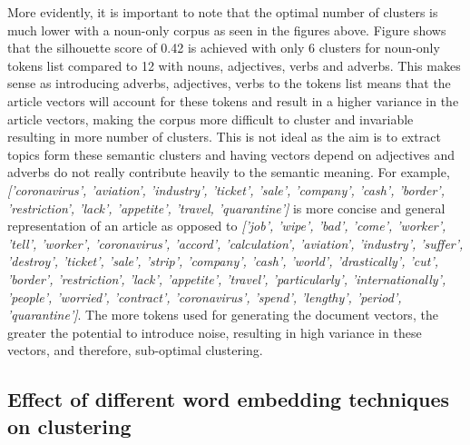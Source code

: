 More evidently, it is important to note that the optimal number of clusters is much lower with a noun-only corpus as seen in the figures above. Figure \label{fig:pos_business2020} shows that the silhouette score of 0.42 is achieved with only 6 clusters for noun-only tokens list compared to 12 with nouns, adjectives, verbs and adverbs. This makes sense as introducing adverbs, adjectives, verbs to the tokens list means that the article vectors will account for these tokens and result in a higher variance in the article vectors, making the corpus more difficult to cluster and invariable resulting in more number of clusters. This is not ideal as the aim is to extract topics form these semantic clusters and having vectors depend on adjectives and adverbs do not really contribute heavily to the semantic meaning. For example, \textit{['coronavirus', 'aviation', 'industry', 'ticket', 'sale', 'company', 'cash', 'border', 'restriction', 'lack', 'appetite', 'travel, 'quarantine']} is more concise and general representation of an article as opposed to \textit{['job', 'wipe', 'bad', 'come', 'worker', 'tell', 'worker', 'coronavirus', 'accord', 'calculation', 'aviation', 'industry', 'suffer', 'destroy', 'ticket', 'sale', 'strip', 'company', 'cash', 'world', 'drastically', 'cut', 'border', 'restriction', 'lack', 'appetite', 'travel', 'particularly', 'internationally', 'people', 'worried', 'contract', 'coronavirus', 'spend', 'lengthy', 'period', 'quarantine']}. The more tokens used for generating the document vectors, the greater the potential to introduce noise, resulting in high variance in these vectors, and therefore, sub-optimal clustering. 


\subsection{Effect of different word embedding techniques on clustering} \label{s:word_embeddings}

